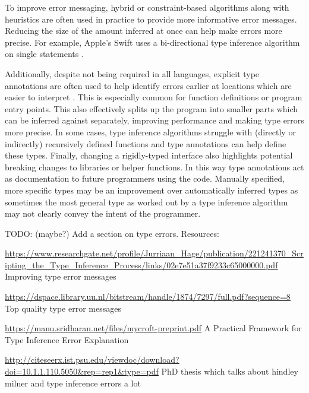 \documentclass[a4paper,fleqn,oneside,12pt]{report}
\begin{document}
To improve error messaging, hybrid or constraint-based algorithms along with heuristics are often used in practice to provide more informative error messages. Reducing the size of the amount inferred at once can help make errors more precise. For example, Apple’s Swift uses a bi-directional type inference algorithm on single statements \citep{ref34}.

Additionally, despite not being required in all languages, explicit type annotations are often used to help identify errors earlier at locations which are easier to interpret \citep{ref35}. This is especially common for function definitions or program entry points. This also effectively splits up the program into smaller parts which can be inferred against separately, improving performance and making type errors more precise. In some cases, type inference algorithms struggle with (directly or indirectly) recursively defined functions and type annotations can help define these types. Finally, changing a rigidly-typed interface also highlights potential breaking changes to libraries or helper functions. In this way type annotations act as documentation to future programmers using the code. Manually specified, more specific types may be an improvement over automatically inferred types as sometimes the most general type as worked out by a type inference algorithm may not clearly convey the intent of the programmer.

TODO: (maybe?) Add a section on type errors. Resources:

\underline{\href{https://www.researchgate.net/profile/Jurriaan\_Hage/publication/221241370\_Scripting\_the\_Type\_Inference\_Process/links/02e7e51a37f9233c65000000.pdf}{https://www.researchgate.net/profile/Jurriaan\_Hage/publication/221241370\_Scripting\_the\_Type\_Inference\_Process/links/02e7e51a37f9233c65000000.pdf}}
Improving type error messages

\underline{\href{https://dspace.library.uu.nl/bitstream/handle/1874/7297/full.pdf?sequence=8}{https://dspace.library.uu.nl/bitstream/handle/1874/7297/full.pdf?sequence=8}}
Top quality type error messages

\underline{\href{https://manu.sridharan.net/files/mycroft-preprint.pdf}{https://manu.sridharan.net/files/mycroft-preprint.pdf}}
A Practical Framework for Type Inference Error Explanation

\underline{\href{http://citeseerx.ist.psu.edu/viewdoc/download?doi=10.1.1.110.5050\&rep=rep1\&type=pdf}{http://citeseerx.ist.psu.edu/viewdoc/download?doi=10.1.1.110.5050\&rep=rep1\&type=pdf}}
PhD thesis which talks about hindley milner and type inference errors a lot
\end{document}
